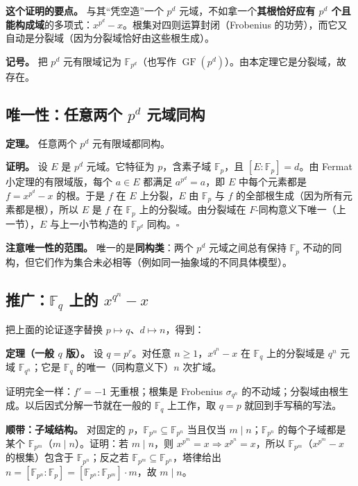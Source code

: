 \textbf{这个证明的要点。} 与其“凭空造”一个 $p^d$ 元域，不如拿一个\textbf{其根恰好应有 $p^d$ 个且能构成域}的多项式：$x^{p^d}-x$。根集对四则运算封闭（Frobenius 的功劳），而它又自动是分裂域（因为分裂域恰好由这些根生成）。

\textbf{记号。} 把 $p^d$ 元有限域记为 $\mathbb F_{p^d}$（也写作 $\operatorname{GF}(p^d)$）。由本定理它是分裂域，故存在。

\subsection{唯一性：任意两个 $p^d$ 元域同构}


\textbf{定理。} 任意两个 $p^d$ 元有限域都同构。

\textbf{证明。} 设 $E$ 是 $p^d$ 元域。它特征为 $p$，含素子域 $\mathbb F_p$，且 $[E:\mathbb F_p]=d$。由 Fermat 小定理的有限域版，每个 $a\in E$ 都满足 $a^{p^d}=a$，即 $E$ 中每个元素都是 $f=x^{p^d}-x$ 的根。于是 $f$ 在 $E$ 上分裂，$E$ 由 $\mathbb F_p$ 与 $f$ 的全部根生成（因为所有元素都是根），所以 $E$ 是 $f$ 在 $\mathbb F_p$ 上的分裂域。由分裂域在 $F$-同构意义下唯一（上一节），$E$ 与上一小节构造的 $\mathbb F_{p^d}$ 同构。$\square$

\textbf{注意唯一性的范围。} 唯一的是\textbf{同构类}：两个 $p^d$ 元域之间总有保持 $\mathbb F_p$ 不动的同构，但它们作为集合未必相等（例如同一抽象域的不同具体模型）。

\subsection{推广：$\mathbb F_q$ 上的 $x^{q^n}-x$}


把上面的论证逐字替换 $p\mapsto q$、$d\mapsto n$，得到：

\textbf{定理（一般 $q$ 版）。} 设 $q=p^r$。对任意 $n\ge1$，$x^{q^n}-x$ 在 $\mathbb F_q$ 上的分裂域是 $q^n$ 元域 $\mathbb F_{q^n}$；它是 $\mathbb F_q$ 的唯一（同构意义下）$n$ 次扩域。

证明完全一样：$f'=-1$ 无重根；根集是 Frobenius $\sigma_{q^n}$ 的不动域；分裂域由根生成。以后因式分解一节就在一般的 $\mathbb F_q$ 上工作，取 $q=p$ 就回到手写稿的写法。

\textbf{顺带：子域结构。} 对固定的 $p$，$\mathbb F_{p^m}\subseteq\mathbb F_{p^n}$ 当且仅当 $m\mid n$；$\mathbb F_{p^n}$ 的每个子域都是某个 $\mathbb F_{p^m}$（$m\mid n$）。证明：若 $m\mid n$，则 $x^{p^m}=x\Rightarrow x^{p^n}=x$，所以 $\mathbb F_{p^m}$（$x^{p^m}-x$ 的根集）包含于 $\mathbb F_{p^n}$；反之若 $\mathbb F_{p^m}\subseteq\mathbb F_{p^n}$，塔律给出 $n=[\mathbb F_{p^n}:\mathbb F_p]=[\mathbb F_{p^n}:\mathbb F_{p^m}]\cdot m$，故 $m\mid n$。

